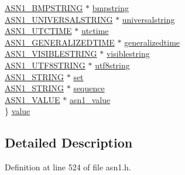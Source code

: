 \begin{DoxyCompactItemize}
\begin{tabbing}
\>\hyperlink{crypto_2ossl__typ_8h_abc173b064658f5e3eb2221ecb6c7903f}{ASN1\_BMPSTRING} $\ast$ \hyperlink{structasn1__type__st_a6c41d7f7046b5f2fde27a02d6d201a2d}{bmpstring}\\
\>\hyperlink{crypto_2ossl__typ_8h_a1510a8330e0ae6e95454bb7767d97843}{ASN1\_UNIVERSALSTRING} $\ast$ \hyperlink{structasn1__type__st_a5f9d5a2ac2b5a7a6300f996eca5a19c7}{universalstring}\\
\>\hyperlink{crypto_2ossl__typ_8h_af919cffc24215ead48adbe4eb24f8370}{ASN1\_UTCTIME} $\ast$ \hyperlink{structasn1__type__st_a00dc22675c29948075a8e97d2fd57129}{utctime}\\
\>\hyperlink{crypto_2ossl__typ_8h_abd19ea5b527807ce3a516e6a41440f84}{ASN1\_GENERALIZEDTIME} $\ast$ \hyperlink{structasn1__type__st_a69c39e848340ccaa3ebd1e117fb056ce}{generalizedtime}\\
\>\hyperlink{crypto_2ossl__typ_8h_afcaa361f9f64fa02c536adae60a06755}{ASN1\_VISIBLESTRING} $\ast$ \hyperlink{structasn1__type__st_a9ddcddc3ae7ca621aaf6505b334d1ac9}{visiblestring}\\
\>\hyperlink{crypto_2ossl__typ_8h_ad7ed3ce45259147bc338c4849377d2bb}{ASN1\_UTF8STRING} $\ast$ \hyperlink{structasn1__type__st_aa6cbc79cdb8165fad02e88ca25e77dc8}{utf8string}\\
\>\hyperlink{crypto_2ossl__typ_8h_ad37610875e38aa6c59f5e6e0b437e65c}{ASN1\_STRING} $\ast$ \hyperlink{structasn1__type__st_a3af81614cf739c43b372bcf6be6c6607}{set}\\
\>\hyperlink{crypto_2ossl__typ_8h_ad37610875e38aa6c59f5e6e0b437e65c}{ASN1\_STRING} $\ast$ \hyperlink{structasn1__type__st_ad6df88fe00a72b91394ae1b8b62d11ee}{sequence}\\
\>\hyperlink{crypto_2asn1_2asn1_8h_aaa5ffa26b0bbba094a9ee353b8ade6ab}{ASN1\_VALUE} $\ast$ \hyperlink{structasn1__type__st_a5b16847c55935c796161c1578ae3fbf7}{asn1\_value}\\
\} \hyperlink{structasn1__type__st_af3dc6466d27cceff4e002600514915fd}{value}\\

\end{tabbing}\end{DoxyCompactItemize}


\subsection{Detailed Description}


Definition at line 524 of file asn1.\+h.



